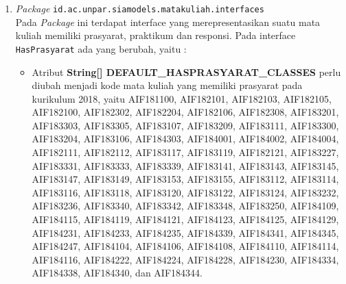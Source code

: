 \begin{enumerate}
	\item \textit{Package} \texttt{id.ac.unpar.siamodels.matakuliah.interfaces}\\
	Pada \textit{Package} ini terdapat interface yang merepresentasikan suatu mata kuliah memiliki prasyarat, praktikum dan responsi. Pada interface \texttt{HasPrasyarat} ada yang berubah, yaitu :
	\begin{itemize}
		\item Atribut \textbf{String[] DEFAULT\_HASPRASYARAT\_CLASSES} perlu diubah menjadi kode mata kuliah yang memiliki prasyarat pada kurikulum 2018, yaitu AIF181100, AIF182101,
		AIF182103, AIF182105, AIF182100, AIF182302,
		AIF182204, AIF182106, AIF182308, AIF183201,
		AIF183303, AIF183305, AIF183107, AIF183209,
		AIF183111, AIF183300, AIF183204, AIF183106,
		AIF184303, AIF184001, AIF184002, AIF184004,
		AIF182111, AIF182112, AIF183117, AIF183119,
		AIF182121, AIF183227, AIF183331, AIF183333,
		AIF183339, AIF183141, AIF183143, AIF183145,
		AIF183147, AIF183149, AIF183153, AIF183155,
		AIF183112, AIF183114, AIF183116, AIF183118, 
		AIF183120, AIF183122, AIF183124, AIF183232,
		AIF183236, AIF183340, AIF183342, AIF183348, 
		AIF183250, AIF184109, AIF184115, AIF184119,
		AIF184121, AIF184123, AIF184125, AIF184129,
		AIF184231, AIF184233, AIF184235, AIF184339,
		AIF184341, AIF184345, AIF184247, AIF184104,
		AIF184106, AIF184108, AIF184110, AIF184114,
		AIF184116, AIF184222, AIF184224, AIF184228,
		AIF184230, AIF184334, AIF184338, AIF184340,
		dan AIF184344.
	\end{itemize}
	

\end{enumerate}
